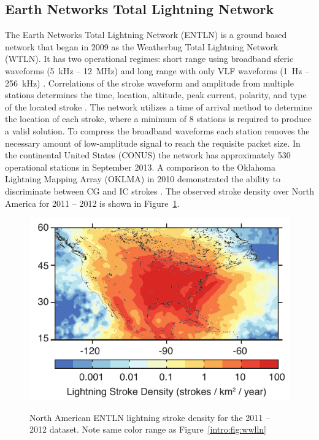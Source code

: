 \subsection{Earth Networks Total Lightning Network}

The Earth Networks Total Lightning Network (ENTLN) is a ground based network that began in 2009 as the Weatherbug Total Lightning Network (WTLN).
It has two operational regimes: short range using broadband sferic waveforms (5~kHz -- 12~MHz) and long range with only VLF waveforms (1~Hz -- 256~kHz) \citep{Heckman2010}.
Correlations of the stroke waveform and amplitude from multiple stations determines the time, location, altitude, peak current, polarity, and type of the located stroke \citep{Liu2011a}.
The network utilizes a time of arrival method to determine the location of each stroke, where a minimum of 8 stations is required to produce a valid solution.
To compress the broadband waveforms each station removes the necessary amount of low-amplitude signal to reach the requisite packet size.
In the continental United States (CONUS) the network has approximately 530 operational stations in September 2013.
A comparison to the Oklahoma Lightning Mapping Array (OKLMA) in 2010 demonstrated the ability to discriminate between CG and IC strokes \citep{Beasley2010}.
The observed stroke density over North America for 2011 -- 2012 is shown in Figure~\ref{intro:fig:entln}.

\begin{figure}[ht!]
	\centering
	\includegraphics[scale=1]{Introduction/Figures/entln_density.pdf}\\
	\caption{North American ENTLN lightning stroke density for the 2011 -- 2012 dataset.
	              Note same color range as Figure~\ref{intro:fig:wwlln}}
	\label{intro:fig:entln}
\end{figure}

